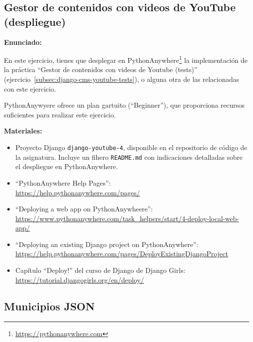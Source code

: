 \subsection{Gestor de contenidos con videos de YouTube (despliegue)}
\label{subsec:django-cms-youtube-despliegue}

\textbf{Enunciado:}

En este ejercicio, tienes que desplegar en PythonAnywhere\footnote{\url{https://pythonanywhere.com}} la implementación de la práctica  ``Gestor de contenidos con videos de Youtube (tests)'' (ejercicio~\ref{subsec:django-cms-youtube-tests}), o alguna otra de las relacionadas con este ejercicio.

PythonAnywyere ofrece un plan gartuito (``Beginner''), que proporciona recursos suficientes para realizar este ejercicio.

\textbf{Materiales:}

\begin{itemize}
\item Proyecto Django \verb|django-youtube-4|, disponible en el repositorio de código de la asignatura. Incluye un fihero \verb|README.md| con indicaciones detalladas sobre el despliegue en PythonAnywhere.
\item ``PythonAnywhere Help Pages'': \\
  \url{https://help.pythonanywhere.com/pages/}
\item ``Deploying a web app on PythonAnywheere'': \\
  \url{https://www.pythonanywhere.com/task_helpers/start/4-deploy-local-web-app/}
\item ``Deploying an existing Django project on PythonAnywhere'': \\
  \url{https://help.pythonanywhere.com/pages/DeployExistingDjangoProject}
\item Capítulo ``Deploy!'' del curso de Django de Django Girls: \\
  \url{https://tutorial.djangogirls.org/en/deploy/}
\end{itemize}

\subsection{Municipios JSON}
\label{subsec:json-municipios}

